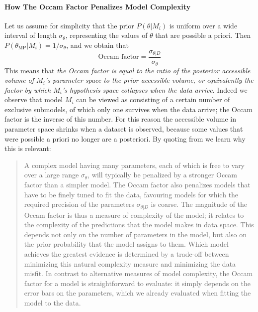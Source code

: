 \paragraph{How The Occam Factor Penalizes Model Complexity}
Let us assume for simplicity that the prior $P(\theta|M_i)$ is uniform over a wide interval of length $\sigma_\theta$, representing the values of $\theta$ that are possible a priori. Then $P(\theta_{\text{MP}}|M_i) = 1/\sigma_\theta$, and we obtain that
\begin{equation*}
    \text{Occam factor} = \frac{\sigma_{\theta|D}}{\sigma_\theta}
\end{equation*}
This means that \emph{the Occam factor is equal to the ratio of the posterior accessible volume of $M_i$'s parameter space to the prior accessible volume, or equivalently the factor by which $M_i$'s hypothesis space collapses when the data arrive}. Indeed we observe that model $M_i$ can be viewed as consisting of a certain number of exclusive submodels, of which only one survives when the data arrive; the Occam factor is the inverse of this number. For this reason the accessible volume in parameter space shrinks when a dataset is observed, because some values that were possible a priori no longer are a posteriori.
By quoting from \cite{mckay} we learn why this is relevant:
\begin{quote}
A complex model having many parameters, each of which is free to vary over a large range $\sigma_\theta$, will typically be penalized by a stronger Occam factor than a simpler model. The Occam factor also penalizes models that have to
be finely tuned to fit the data, favouring models for which the required precision of the parameters $\sigma_{\theta|D}$ is coarse. The magnitude of the Occam factor is thus a measure of complexity of the model; it relates to the complexity of
the predictions that the model makes in data space. This depends not only on the number of parameters in the model, but also on the prior probability that the model assigns to them. Which model achieves the greatest evidence
is determined by a trade-off between minimizing this natural complexity measure and minimizing the data misfit. In contrast to alternative measures of model complexity, the Occam factor for a model is straightforward to evaluate: it simply depends on the error bars on the parameters, which we already evaluated when fitting the model to the data.
\end{quote}

